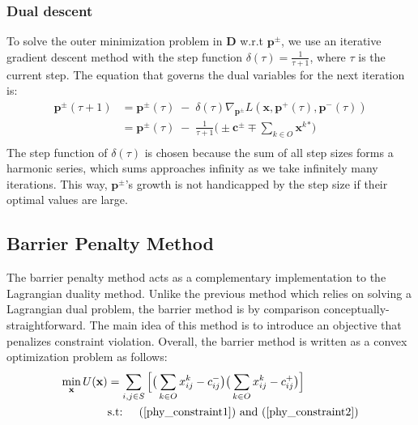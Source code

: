 \documentclass[sigconf]{acmart}
\theoremstyle{definition}
\begin{document}
\subsubsection{Dual descent\\}
To solve the outer minimization problem in $\mathbf{D}$ w.r.t $\mathbf{p}^{\pm}$, we use an iterative gradient descent method with the step function $\delta(\tau) = \frac{1}{\tau + 1}$, where $\tau$ is the current step. The equation that governs the dual variables for the next iteration is:
\begin{equation}\label{gradient_projection}
\begin{aligned}
\mathbf{p}^{\pm}(\tau + 1) &= \mathbf{p}^{\pm}(\tau) \; - \; \delta(\tau) \nabla_{\mathbf{p}^{\pm}} L(\mathbf{x}, \mathbf{p}^+(\tau), \mathbf{p}^-(\tau))\\
&= \mathbf{p}^{\pm}(\tau) \; - \; \frac{1}{\tau + 1} \big(\pm \mathbf{c}^{\pm} \mp \sum_{k \in O}\mathbf{x}^k{}^* \big) \\
\end{aligned}
\end{equation}
The step function of $\delta(\tau)$ is chosen because the sum of all step sizes forms a harmonic series, which sums approaches infinity as we take infinitely many iterations. This way, $\mathbf{p}^\pm$'s growth is not handicapped by the step size if their optimal values are large.


\subsection{Barrier Penalty Method}
The barrier penalty method acts as a complementary implementation to the Lagrangian duality method. Unlike the previous method which relies on solving a Lagrangian dual problem, the barrier method is by comparison conceptually-straightforward. The main idea of this method is to introduce an objective that penalizes constraint violation. Overall, the barrier method is written as a convex optimization problem as follows:
\begin{equation}
\begin{aligned}
\min\limits_{\mathbf{x}} U(\mathbf{x}) & = \sum_{i, j \in S}\Big[\big(\sum_{k \in O}x_{ij}^k - c_{ij}^-\big) \big(\sum_{k \in O}x_{ij}^k - c_{ij}^+\big)\Big]\\
& \text{s.t: } \quad (\ref{phy_constraint1}) \text{ and } (\ref{phy_constraint2})
\end{aligned}\label{eqn:barrier_objective}
\end{equation}
\end{document}
